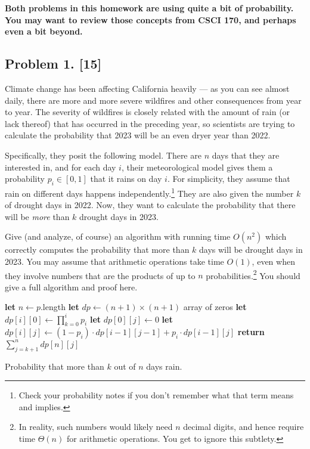 \documentclass[10pt]{article}
\begin{document}
\newpage

\textbf{Both problems in this homework are using quite a bit of probability. You may want to review those concepts from CSCI 170, and perhaps even a bit beyond.}

\subsection*{Problem 1. [15]}
Climate change has been affecting California heavily --- as you can see almost daily, there are more and more severe wildfires and other consequences from year to year. The severity of wildfires is closely related with the amount of rain (or lack thereof) that has occurred in the preceding year, so scientists are trying to calculate the probability that 2023 will be an even dryer year than 2022.

Specifically, they posit the following model. There are $n$ days that they are interested in, and for each day $i$, their meteorological model gives them a probability $p_i \in [0,1]$ that it rains on day $i$. For simplicity, they assume that rain on different days happens independently.\footnote{Check your probability notes if you don't remember what that term means and implies.} They are also given the number $k$ of drought days in 2022. Now, they want to calculate the probability that there will be \emph{more} than $k$ drought days in 2023.

Give (and analyze, of course) an algorithm with running time $O(n^2)$ which correctly computes the probability that more than $k$ days will be drought days in 2023. You may assume that arithmetic operations take time $O(1)$, even when they involve numbers that are the products of up to $n$ probabilities.\footnote{In reality, such numbers would likely need $n$ decimal digits, and hence require time $\Theta(n)$ for arithmetic operations. You get to ignore this subtlety.}
You should give a full algorithm and proof here.


\begin{algorithm}[htb]
  \begin{algorithmic}
    \STATE \textbf{let} \(n \gets p\).length
    \STATE \textbf{let} \(dp \gets (n + 1) \times (n + 1)\) array of zeros
      \STATE \textbf{let} \(dp[i][0] \gets \prod_{k = 0}^i p_i\)
    \ENDFOR
      \STATE \textbf{let} \(dp[0][j] \gets 0\)
    \ENDFOR
        \STATE \textbf{let} \(dp[i][j] \gets (1 - p_i) \cdot dp[i - 1][j - 1] + p_i \cdot dp[i - 1][j]\)
      \ENDFOR
    \ENDFOR
    \STATE \textbf{return} \(\sum_{j = k + 1}^n dp[n][j]\)
  \end{algorithmic}
  \caption{Probability that more than \(k\) out of \(n\) days rain. \label{alg:rain-days}}
  \end{algorithm}
\end{document}
